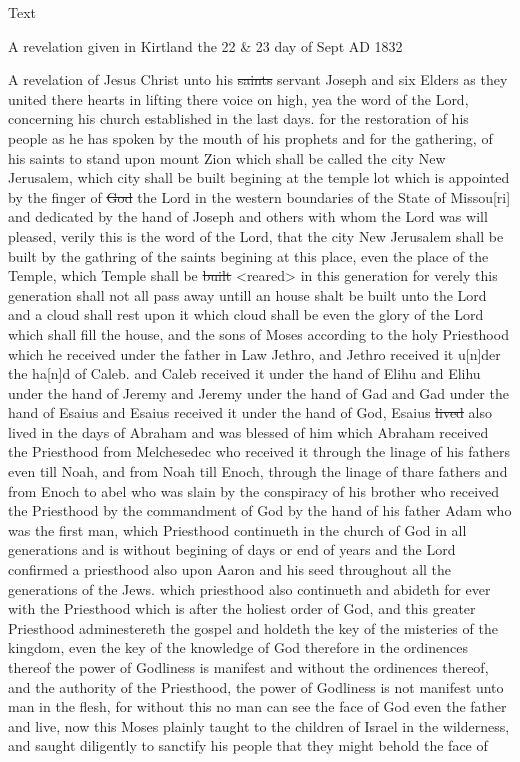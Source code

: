 			\begin{description}
				\item[Text]
			\end{description}
			
				\begin{tightcenter}
				A revelation given in Kirtland the 22 \& 23 day of Sept AD 1832
				\end{tightcenter}
				
				A revelation of Jesus Christ unto his \sout{saints} servant Joseph and six Elders as they united there hearts in lifting there voice on high, yea the word of the Lord, concerning his church established in the last days. for the restoration of his people as he has spoken by the mouth of his prophets and for the gathering, of his saints to stand upon mount Zion which shall be called the city New Jerusalem, which city shall be built begining at the temple lot which is appointed by the finger of \sout{God} the Lord in the western boundaries of the State of Missou[ri] and dedicated by the hand of Joseph and others with whom the Lord was will pleased, verily this is the word of the Lord, that the city New Jerusalem shall be built by the gathring of the saints begining at this place, even the place of the Temple, which Temple shall be \sout{built} <reared> in this generation for verely this generation shall not all pass away untill an house shalt be built unto the Lord and a cloud shall rest upon it which cloud shall be even the glory of the Lord which shall fill the house, and the sons of Moses according to the holy Priesthood which he received under the father in Law Jethro, and Jethro received it u[n]der the ha[n]d of Caleb. and Caleb received it under the hand of Elihu and Elihu under the hand of Jeremy and Jeremy under the hand of Gad and Gad under the hand of Esaius and Esaius received it under the hand of God, Esaius \sout{lived} also lived in the days of Abraham and was blessed of him which Abraham received the Priesthood from Melchesedec who received it through the linage of his fathers even till Noah, and from Noah till Enoch, through the linage of thare fathers and from Enoch to abel who was slain by the conspiracy of his brother who received the Priesthood by the commandment of God by the hand of his father Adam who was the first man, which Priesthood continueth in the church of God in all generations and is without begining of days or end of years and the Lord confirmed a priesthood also upon Aaron and his seed throughout all the generations of the Jews. which priesthood also continueth and abideth for ever with the Priesthood which is after the holiest order of God, and this greater Priesthood adminestereth the gospel and holdeth the key of the misteries of the kingdom, even the key of the knowledge of God therefore in the ordinences thereof the power of Godliness is manifest and without the ordinences thereof, and the authority of the Priesthood, the power of Godliness is not manifest unto man in the flesh, for without this no man can see the face of God even the father and live, now this Moses plainly taught to the children of Israel in the wilderness, and saught diligently to sanctify his people that they might behold the face of 